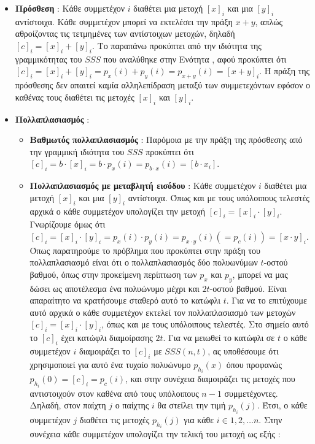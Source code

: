 \begin{itemize}
    \item \textbf{Πρόσθεση} : Κάθε συμμετέχον $i$ διαθέτει μια μετοχή $[x]_i$ και μια $[y]_i$ αντίστοιχα. Κάθε συμμετέχον μπορεί να εκτελέσει την πράξη $x+y$, απλώς αθροίζοντας τις τετμημένες των αντίστοιχων μετοχών, δηλαδή $[c]_i = [x]_i + [y]_i$. Το παραπάνω προκύπτει από την ιδιότητα της γραμμικότητας του $SSS$ που αναλύθηκε στην Ενότητα , αφού προκύπτει ότι $[c]_i = [x]_i + [y]_i = p_x(i) + p_y(i) = p_{x+y}(i) = [x + y]_i$. Η πράξη της πρόσθεσης δεν απαιτεί καμία αλληλεπίδραση μεταξύ των συμμετεχόντων εφόσον ο καθένας τους διαθέτει τις μετοχές $[x]_i$ και $[y]_i$.
    \item \textbf{Πολλαπλασιασμός} :  
        \begin{itemize}
            \item \textbf{Βαθμωτός πολλαπλασιασμός} : Παρόμοια με την πράξη της πρόσθεσης από την γραμμική ιδιότητα του $SSS$ προκύπτει ότι $[c]_i = b \cdot [x]_i = b \cdot p_x(i) = p_{b \cdot x}(i) = [b \cdot x_i ]$.
            \item \textbf{Πολλαπλασιασμός με μεταβλητή εισόδου} : Κάθε συμμετέχον $i$ διαθέτει μια μετοχή $[x]_i$ και μια $[y]_i$ αντίστοιχα. Όπως και με τους υπόλοιπους τελεστές αρχικά ο κάθε συμμετέχον υπολογίζει την μετοχή $[c]_i = [x]_i \cdot [y]_i$. Γνωρίζουμε όμως ότι $[c]_i = [x]_i \cdot [y]_i = p_x(i) \cdot p_y(i) = p_{x \cdot y}(i) (= p_c(i))= [x \cdot y]_i$. Όπως παρατηρούμε το πρόβλημα που προκύπτει στην πράξη του πολλαπλασιασμό είναι ότι ο πολλαπλασιασμός δύο πολυωνύμων $t$-οστού βαθμού, όπως στην προκείμενη περίπτωση των $p_x$ και $p_y$, μπορεί να μας δώσει ως αποτέλεσμα ένα πολυώνυμο μέχρι και $2t$-οστού βαθμού. Είναι απαραίτητο να κρατήσουμε σταθερό αυτό το κατώφλι $t$. Για να το επιτύχουμε αυτό αρχικά ο κάθε συμμετέχον εκτελεί τον πολλαπλασιασμό των μετοχών $[c]_i = [x]_i \cdot [y]_i$, όπως και με τους υπόλοιπους τελεστές. Στο σημείο αυτό το $[c]_i$ έχει κατώφλι διαμοίρασης $2t$. Για να μειωθεί το κατώφλι σε $t$ ο κάθε συμμετέχον $i$ διαμοιράζει το $[c]_i$ με $SSS(n, t)$, ας υποθέσουμε ότι χρησιμοποιεί για αυτό ένα τυχαίο πολυώνυμο $p_{h_i}(x)$ όπου προφανώς $p_{h_i}(0)=[c]_i=p_c(i)$, και στην συνέχεια διαμοιράζει τις μετοχές που αντιστοιχούν στον καθένα από τους υπόλοιπους $n-1$ συμμετέχοντες. Δηλαδή, στον παίχτη $j$ ο παίχτης $i$ θα στείλει την τιμή $p_{h_i}(j)$. Έτσι, ο κάθε συμμετέχον $j$ διαθέτει τις μετοχές $p_{h_i}(j)$ για κάθε $i \in 1, 2, \ldots n$. Στην συνέχεια κάθε συμμετέχον υπολογίζει την τελική του μετοχή ως εξής :
            

\end{itemize}
\end{itemize}
